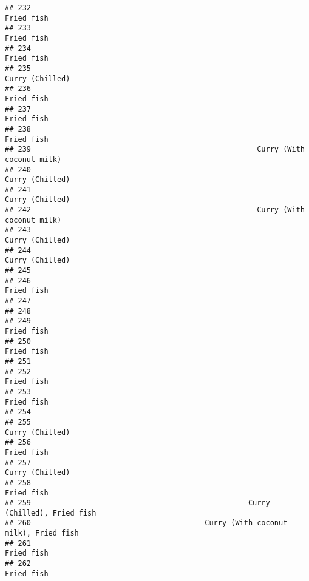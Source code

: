 \documentclass[
]{article}
\begin{document}
\begin{verbatim}
## 232                                                                   Fried fish
## 233                                                                   Fried fish
## 234                                                                   Fried fish
## 235                                                              Curry (Chilled)
## 236                                                                   Fried fish
## 237                                                                   Fried fish
## 238                                                                   Fried fish
## 239                                                    Curry (With coconut milk)
## 240                                                              Curry (Chilled)
## 241                                                              Curry (Chilled)
## 242                                                    Curry (With coconut milk)
## 243                                                              Curry (Chilled)
## 244                                                              Curry (Chilled)
## 245                                                                             
## 246                                                                   Fried fish
## 247                                                                             
## 248                                                                             
## 249                                                                   Fried fish
## 250                                                                   Fried fish
## 251                                                                             
## 252                                                                   Fried fish
## 253                                                                   Fried fish
## 254                                                                             
## 255                                                              Curry (Chilled)
## 256                                                                   Fried fish
## 257                                                              Curry (Chilled)
## 258                                                                   Fried fish
## 259                                                  Curry (Chilled), Fried fish
## 260                                        Curry (With coconut milk), Fried fish
## 261                                                                   Fried fish
## 262                                                                   Fried fish

\end{verbatim}
\end{document}
